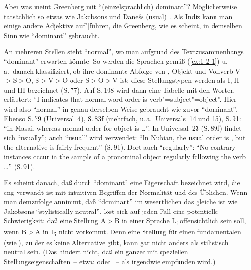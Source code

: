 \documentclass[output=paper]{langsci/langscibook}
\begin{document}
\ssubsection{}%
\label{subsec:1-2.3}
Aber was meint Greenberg mit "`(einzelsprachlich) dominant"'? Möglicherweise tatsächlich so etwas wie Jakobsons  und Dane\v{s}s 
(usual) . Als Indiz kann man einige andere Adjektive auf"|führen, die
Greenberg, wie es scheint, in demselben Sinn wie "`dominant"' gebraucht.

An mehreren Stellen steht "`normal"', wo man aufgrund des Textzusammenhangs
"`dominant"' erwarten könnte. So werden die Sprachen gemäß (\ref{ex:1-2-1}) u.\,a.\ danach klassifiziert, ob ihre dominante Abfolge von , Objekt und Vollverb V$>$S$>$O, S$>$V$>$O
oder S$>$O$>$V ist; diese Stellungstypen werden als I, II und III bezeichnet (S.\,77). Auf
S.\,108 wird dann eine Tabelle mit den Worten erläutert: "`I indicates that normal
word order is verb"=subject"=object"'. Hier wird also "`normal"' in genau derselben Weise gebraucht wie zuvor "`dominant"'. Ebenso \zb S.\,79 (Universal~4), S.\,83f (mehrfach,
u.\,a.\ Universals~14 und 15), S.\,91: "`in Masai, whereas normal order for  object
is  \ldots"'. In Universal~23 (S.\,89f) findet sich "`usually"'; auch "`usual"' wird verwendet: "`In Nubian, the usual  order is , but the alternative  is fairly frequent"' (S.\,91). Dort auch "`regularly"': "`No contrary instances occur in the sample of
a pronominal object regularly following the verb \ldots"' (S.\,91).

Es scheint danach, daß durch "`dominant"' eine Eigenschaft bezeichnet
wird, die eng verwandt ist mit intuitiven Begriffen der Normalität und
des Üblichen. Wenn man demzufolge annimmt, daß "`dominant"' im
wesentlichen das gleiche ist wie Jakobsons "`stylistically neutral"',
löst sich auf jeden Fall eine potentielle Schwierigkeit: daß eine
Stellung A$>$B in einer Sprache L\textsubscript{i} offensichtlich
 sein soll, wenn B$>$A in L\textsubscript{i} nicht
vorkommt. Denn eine Stellung für einen fundamentalen  (wie
), zu der es keine Alternative gibt, kann gar
nicht anders als stilistisch neutral sein. (Das hindert nicht, daß ein
ganzer  mit speziellen Stellungseigenschaften~-- etwa:
 oder ~-- als irgendwie 
empfunden wird.)
\end{document}
